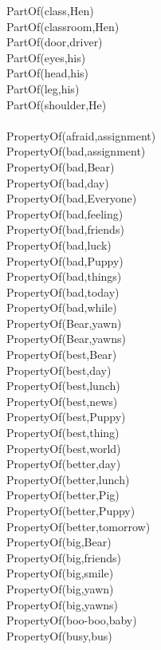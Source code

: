 \begin{multicols}{2}
\begin{footnotesize}
PartOf(class,Hen) \\
PartOf(classroom,Hen) \\
PartOf(door,driver) \\
PartOf(eyes,his) \\
PartOf(head,his) \\
PartOf(leg,his) \\
PartOf(shoulder,He) \\
~\\
PropertyOf(afraid,assignment) \\
PropertyOf(bad,assignment) \\
PropertyOf(bad,Bear) \\
PropertyOf(bad,day) \\
PropertyOf(bad,Everyone) \\
PropertyOf(bad,feeling) \\
PropertyOf(bad,friends) \\
PropertyOf(bad,luck) \\
PropertyOf(bad,Puppy) \\
PropertyOf(bad,things) \\
PropertyOf(bad,today) \\
PropertyOf(bad,while) \\
PropertyOf(Bear,yawn) \\
PropertyOf(Bear,yawns) \\
PropertyOf(best,Bear) \\
PropertyOf(best,day) \\
PropertyOf(best,lunch) \\
PropertyOf(best,news) \\
PropertyOf(best,Puppy) \\
PropertyOf(best,thing) \\
PropertyOf(best,world) \\
PropertyOf(better,day) \\
PropertyOf(better,lunch) \\
PropertyOf(better,Pig) \\
PropertyOf(better,Puppy) \\
PropertyOf(better,tomorrow) \\
PropertyOf(big,Bear) \\
PropertyOf(big,friends) \\
PropertyOf(big,smile) \\
PropertyOf(big,yawn) \\
PropertyOf(big,yawns) \\
PropertyOf(boo-boo,baby) \\
PropertyOf(busy,bus) \\

\end{footnotesize}
\end{multicols}
